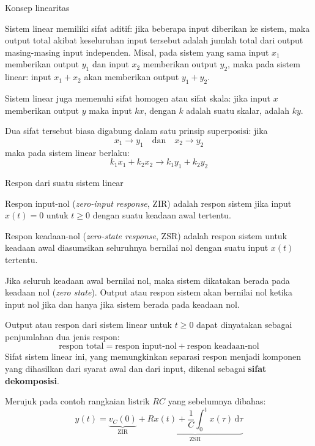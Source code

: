 \begin{frame}{Konsep linearitas}

Sistem linear memiliki sifat aditif: jika beberapa input
diberikan ke sistem, maka output total akibat keseluruhan input tersebut adalah
jumlah total dari output masing-masing input independen.
Misal, pada sistem yang sama input $x_1$ memberikan output $y_1$ dan 
input $x_2$ memberikan output $y_2$, maka pada sistem linear:
input $x_1 + x_2$ akan memberikan output $y_1 + y_2$.

Sistem linear juga memenuhi sifat homogen atau sifat skala: jika input $x$
memberikan output $y$ maka input $kx$, dengan $k$ adalah suatu skalar,
adalah $ky$.

Dua sifat tersebut biasa digabung dalam satu prinsip superposisi: jika
$$
x_{1} \rightarrow y_{1} \quad \text{dan} \quad x_{2} \rightarrow y_{2}
$$
maka pada sistem linear berlaku:
$$
k_{1} x_{1} + k_{2} x_{2} \rightarrow k_{1} y_{1} + k_{2} y_{2}
$$

\end{frame}


\begin{frame}{Respon dari suatu sistem linear}

Respon input-nol (\textit{zero-input response}, ZIR) adalah respon sistem
jika input $x(t) = 0$ untuk $t \geq 0$ dengan suatu keadaan awal tertentu.
  
Respon keadaan-nol (\textit{zero-state response}, ZSR) adalah respon sistem
untuk keadaan awal diasumsikan seluruhnya bernilai nol dengan
suatu input $x(t)$ tertentu.

Jika seluruh keadaan awal bernilai nol, maka sistem dikatakan berada pada
keadaan nol (\textit{zero state}). Output atau respon sistem akan bernilai nol
ketika input nol jika dan hanya jika sistem berada pada keadaan nol.

Output atau respon dari sistem linear untuk $t \geq 0$ dapat dinyatakan sebagai
penjumlahan dua jenis respon:
$$
\text{respon total} = \text{respon input-nol} + \text{respon keadaan-nol}
$$
Sifat sistem linear ini, yang memungkinkan separasi respon menjadi komponen yang
dihasilkan dari syarat awal dan dari input, dikenal sebagai \textbf{sifat dekomposisi}.

\end{frame}


\begin{frame}

Merujuk pada contoh rangkaian listrik $RC$ yang sebelumnya dibahas:
$$
y(t) = \underbrace{v_{C}(0)}_{\text{ZIR}} +
  \underbrace{R x(t) + \frac{1}{C} \int_{0}^{t} x(\tau)\,\mathrm{d}\tau}_{\text{ZSR}}
$$

\end{frame}


